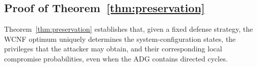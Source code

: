\documentclass[conference]{IEEEtran}
\theoremstyle{definition} %
\theoremstyle{plain} %
\begin{document}







%
%
%



\appendix

\subsection{Proof of Theorem~\ref{thm:preservation}}
\label{app:causal_proof}

Theorem~\ref{thm:preservation} establishes that, given a fixed defense strategy, the WCNF optimum uniquely determines the system-configuration states, the privileges that the attacker may obtain, and their corresponding local compromise probabilities, even when the ADG contains directed cycles.
\end{document}
